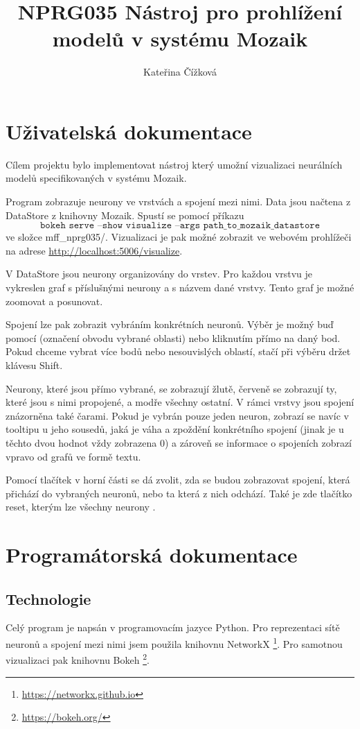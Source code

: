 \documentclass[a4paper,12pt]{article}
\title{NPRG035 Nástroj pro prohlížení modelů v systému Mozaik}
\author{Kateřina Čížková}
\begin{document}
\maketitle

\section{Uživatelská dokumentace}

Cílem projektu bylo implementovat nástroj který umožní vizualizaci neurálních
modelů specifikovaných v systému Mozaik.

Program zobrazuje neurony ve vrstvách a spojení mezi nimi. Data jsou
načtena z DataStore z knihovny Mozaik. Spustí se pomocí příkazu
$$\texttt{bokeh serve --show visualize --args path\_to\_mozaik\_datastore}$$
ve složce mff\_nprg035/. Vizualizaci je pak možné zobrazit ve webovém pro\-hlí\-že\-či
na adrese \url{http://localhost:5006/visualize}.

V DataStore jsou neurony organizovány do vrstev. Pro každou vrstvu je vykreslen graf
s příslušnými neurony a s názvem dané vrstvy. Tento graf je možné zoomovat a posunovat.

Spojení lze pak zobrazit vybráním konkrétních neuronů. Výběr je možný buď pomocí 
(označení obvodu vybrané oblasti) nebo kliknutím přímo na daný bod. Pokud chceme vybrat
více bodů nebo nesouvislých oblastí, stačí při výběru držet klávesu Shift.

Neurony, které jsou přímo vybrané, se zobrazují žlutě, červeně se zobrazují ty, které
jsou s nimi propojené, a modře všechny ostatní. V rámci vrstvy jsou spojení znázorněna
také čarami. Pokud je vybrán pouze jeden neuron, zobrazí se navíc v tooltipu u jeho sousedů, 
jaká je váha a zpoždění konkrétního spojení (jinak je u těchto dvou hodnot vždy zobrazena 0)
a zároveň se informace o spojeních zobrazí vpravo od grafů ve formě textu.

Pomocí tlačítek v horní části se dá zvolit, zda se budou zobrazovat spojení, která přichází 
do vybraných neuronů, nebo ta která z nich odchází. Také je zde tlačítko reset, kterým
lze všechny neurony .

\section{Programátorská dokumentace}

\subsection{Technologie}
Celý program je napsán v programovacím jazyce Python.
Pro reprezentaci sítě neuronů a spojení mezi nimi jsem použila knihovnu NetworkX \footnote{
\url{https://networkx.github.io}}. Pro samotnou vizualizaci pak knihovnu
Bokeh \footnote{\url{https://bokeh.org/}}.
\end{document}
